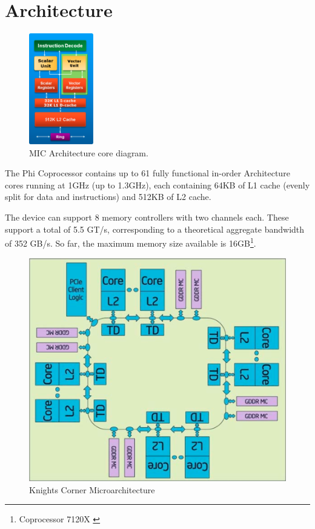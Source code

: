 \documentclass[../thesis]{subfiles}
\begin{document}
	\section{Architecture}
	\label{sec:mic:arch}

	\begin{figure}
		\centering
		\includegraphics[width=0.25\textwidth]{assets/images/mic/arch/core.png}
		\captionsetup{font=small}
		\caption{\intel MIC Architecture core diagram.}
		\label{fig:mic:core}
	\end{figure}

	The \intel\xeon Phi Coprocessor contains up to 61 fully functional in-order \intel\mic Architecture cores running at 1GHz (up to 1.3GHz), each containing 64KB of L1 cache (evenly split for data and instructions) and 512KB of L2 cache.

	The device can support 8 memory controllers with two  channels each. These support a total of 5.5 GT/s, corresponding to a theoretical aggregate bandwidth of 352 GB/s. So far, the maximum memory size available is 16GB\footnote{\intel\xeonphi Coprocessor 7120X \cite{intel:datasheet:xeonphi}}.

	\begin{figure}[!t]
		\centering
		\includegraphics[height=0.3\textheight]{assets/images/mic/arch/microarch.png}
		\caption{Knights Corner Microarchitecture}
	\end{figure}
\end{document}
